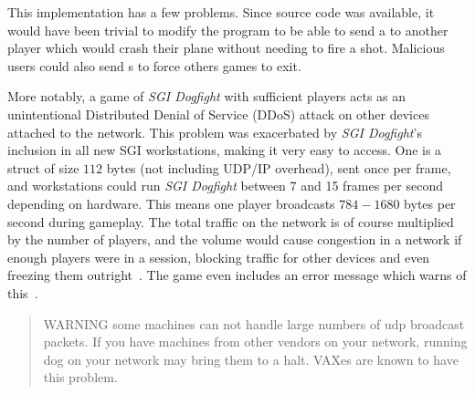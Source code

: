 This implementation has a few problems. Since source code was available, it would have been trivial to modify the program to be able to send a  to another player which would crash their plane without needing to fire a shot. Malicious users could also send s to force others games to exit.

More notably, a game of \textit{SGI Dogfight} with sufficient players acts as an unintentional Distributed Denial of Service (DDoS) attack on other devices attached to the network.
This problem was exacerbated by \textit{SGI Dogfight}'s inclusion in all new SGI workstations, making it very easy to access. One  is a struct of size $112$ bytes (not including UDP/IP overhead), sent once per frame, and workstations could run \textit{SGI Dogfight} between 7 and 15 frames per second depending on hardware. This means one player broadcasts $784-1680$ bytes per second during gameplay. The total traffic on the network is of course multiplied by the number of players, and the volume would cause congestion in a network if enough players were in a session, blocking traffic for other devices and even freezing them outright~\cite{mace}. The game even includes an error message which warns of this~\cite{dogsrc}.

\begin{quote}
  WARNING some machines can not handle large numbers of udp
  broadcast packets. If you have machines from other vendors
  on your network, running dog on your network may bring them
  to a halt. VAXes are known to have this problem.
\end{quote}
